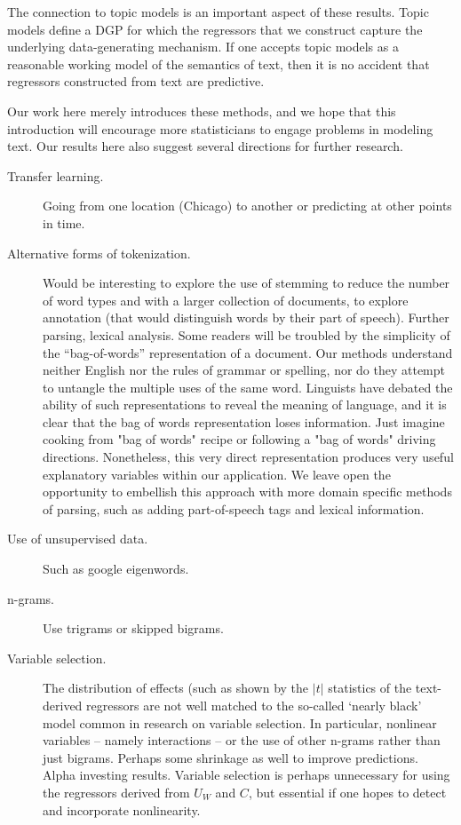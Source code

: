 \documentclass[12pt]{article}
\begin{document}
  
   The connection to topic models is an important aspect of these results.  Topic models define a DGP for which the regressors that we construct capture the underlying data-generating mechanism.  If one accepts topic models as a reasonable working model of the semantics of text, then it is no accident that regressors constructed from text are predictive.


 Our work here merely introduces these methods, and we hope that this introduction will encourage more statisticians to engage problems in  modeling text.  Our results here also suggest several directions for further research.  

   \begin{description}
   
   \item[Transfer learning.]  Going from one location (Chicago) to another or predicting at other points in time.
   
  \item[Alternative forms of tokenization.] Would be interesting to explore the use of stemming to reduce the number of word types and with a larger collection of documents, to explore annotation (that would distinguish words by their part of speech).  Further parsing, lexical analysis.  Some readers will be troubled by the simplicity of the  ``bag-of-words'' representation of a document.  Our methods understand neither English nor the rules of grammar or spelling, nor do they attempt to untangle the multiple uses of the same word.  Linguists have debated the ability of such  representations to reveal the meaning of language, and it is clear that the bag of words representation loses information.  Just imagine cooking from "bag of words" recipe or following a "bag of words" driving directions.  Nonetheless, this very direct representation produces very useful explanatory variables within our application.  We leave open the opportunity to embellish this
 approach with more domain specific methods of parsing, such as adding
 part-of-speech tags and lexical information.
   
   \item[Use of unsupervised data.] Such as google eigenwords.
   
   \item[n-grams.]  Use trigrams or skipped bigrams.
   
   \item[Variable selection.]  The distribution of effects (such as shown by the $|t|$ statistics of the text-derived regressors are not well matched to the so-called `nearly black' model common in research on variable selection.  In particular, nonlinear variables -- namely interactions -- or the use of other n-grams rather than just bigrams.  Perhaps some shrinkage as well to improve predictions.  Alpha investing results.  Variable selection is perhaps unnecessary for using the regressors derived from $U_W$ and $C$, but essential if one hopes to detect and incorporate nonlinearity.
   
   \end{description}
\end{document}
